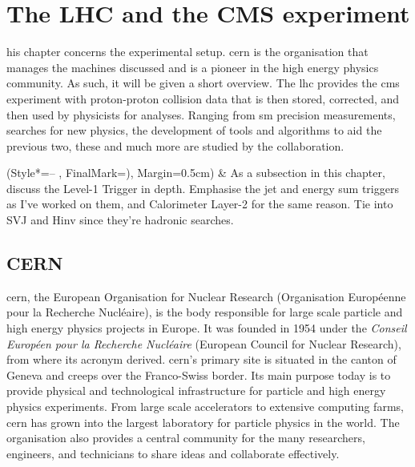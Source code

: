 \let\textcircled=\pgftextcircled
\chapter{The LHC and the CMS experiment}
\label{chap:detector}

his chapter concerns the experimental setup. \acrshort{cern} is the organisation that manages the machines discussed and is a pioneer in the high energy physics community. As such, it will be given a short overview. The \acrlong{lhc} provides the \acrshort{cms} experiment with proton-proton collision data that is then stored, corrected, and then used by physicists for analyses. Ranging from \acrlong{sm} precision measurements, searches for new physics, the development of tools and algorithms to aid the previous two, these and much more are studied by the collaboration.

\begin{easylist}[itemize]
\ListProperties(Style*=-- , FinalMark={)}, Margin=0.5cm)
& As a subsection in this chapter, discuss the Level-1 Trigger in depth. Emphasise the jet and energy sum triggers as I've worked on them, and Calorimeter Layer-2 for the same reason. Tie into SVJ and Hinv since they're hadronic searches.
\end{easylist}




\section{CERN}
\label{sec:detector_cern}

\acrshort{cern}, the European Organisation for Nuclear Research (Organisation Europ\'{e}enne pour la Recherche Nucl\'{e}aire), is the body responsible for large scale particle and high energy physics projects in Europe. It was founded in 1954 under the \emph{Conseil Europ\'{e}en pour la Recherche Nucl\'{e}aire} (European Council for Nuclear Research), from where its acronym derived. \acrshort{cern}'s primary site is situated in the canton of Geneva and creeps over the Franco-Swiss border. Its main purpose today is to provide physical and technological infrastructure for particle and high energy physics experiments. From large scale accelerators to extensive computing farms, \acrshort{cern} has grown into the largest laboratory for particle physics in the world. The organisation also provides a central community for the many researchers, engineers, and technicians to share ideas and collaborate effectively.

